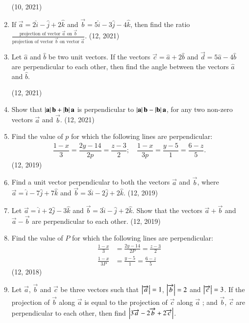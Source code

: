 \begin{enumerate}[label=\thesubsection.\arabic*, ref=\thesubsection.\theenumi]
			\hfill (10, 2021)
	\item If $\vec{a} = 2\hat{i} - \hat{j} + 2\hat{k}$ and $\vec{b} = 5\hat{i} - 3\hat{j} - 4\hat{k}$, then find the ratio $\frac{\text{projection of vector } \vec{a} \text{ on } \vec{b}}{\text{projection of vector } \vec{b} \text{ on vector } \vec{a}}$. \hfill (12, 2021)
	\item Let $\hat{a}$ and $\hat{b}$ be two unit vectors. If the vectors $\vec{c} = \hat{a} + 2\hat{b}$ and $\vec{d} = 5\hat{a} - 4\hat{b}$ are perpendicular to each other, then find the angle between the vectors $\hat{a}$ and $\hat{b}$.

		\hfill (12, 2021)
%	
	\item Show that $\left\vert\mathbf{a}\right\vert \mathbf{b} + \left\vert\mathbf{b}\right\vert \mathbf{a}$ is perpendicular to $\left\vert\mathbf{a}\right\vert \mathbf{b} - \left\vert\mathbf{b}\right\vert \mathbf{a}$, for any two non-zero vectors $\vec{a}$ and $\vec{b}$. \hfill (12, 2021)
	\item Find the value of $p$ for which the following lines are perpendicular:
	\begin{align*}
	\dfrac{1-x}{3} = \dfrac{2y-14}{2p} = \dfrac{z-3}{2}; \quad \dfrac{1-x}{3p} = \dfrac{y-5}{1} = \dfrac{6-z}{5}.
	\end{align*} \hfill (12, 2019)
%	
	\item Find a unit vector perpendicular to both the vectors $\overrightarrow{a}$ and $\overrightarrow{b}$, where $\overrightarrow{a} = \hat{i} - 7\hat{j} + 7\hat{k}$ and $\overrightarrow{b} = 3\hat{i} - 2\hat{j} + 2\hat{k}$. \hfill (12, 2019)
	\item Let $\overrightarrow{a} = \hat{i} + 2\hat{j} - 3\hat{k}$ and $\overrightarrow{b} = 3\hat{i} - \hat{j} + 2\hat{k}$. Show that the vectors $\overrightarrow{a} + \overrightarrow{b}$ and $\overrightarrow{a} - \overrightarrow{b}$ are perpendicular to each other. \hfill (12, 2019)
\item Find the value of $P$ for which the following lines are perpendicular:
\begin{align*}
\frac{1 - x}{3} &= \frac{2y - 14}{2P} = \frac{z - 3}{2}
\\
\frac{1 - x}{3P} &= \frac{y - 5}{1} = \frac{6 - z}{5}
\end{align*}
\hfill (12, 2018)
 \item Let $\overrightarrow{a}$, $\overrightarrow{b} $ and $\overrightarrow{c}$ be three vectors such that $\left\vert\overrightarrow{a}\right\vert=1$, $\left\vert\overrightarrow{b}\right\vert=2 $ and $\left\vert\overrightarrow{c}\right\vert=3$. If the projection of $\overrightarrow{b}$ along $\overrightarrow{a}$ is equal to the projection of $\overrightarrow{c}$ along $\overrightarrow{a}$ ; and $\overrightarrow{b}$, $\overrightarrow{c}$ are perpendicular to each other, then find $\left\vert3\overrightarrow{a}- 2\overrightarrow{b} +2\overrightarrow{c}\right\vert$.

\end{enumerate}
